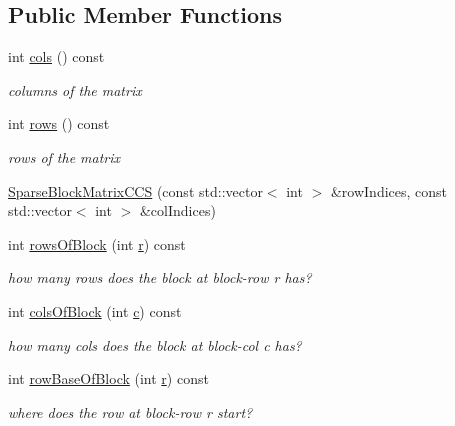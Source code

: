\subsection*{Public Member Functions}
\begin{DoxyCompactItemize}
\item 
int \hyperlink{classg2o_1_1SparseBlockMatrixCCS_a4f04707008af38a3c368eed74ad0bffc}{cols} () const 
\begin{DoxyCompactList}\small\item\em columns of the matrix \end{DoxyCompactList}\item 
int \hyperlink{classg2o_1_1SparseBlockMatrixCCS_ac40b53774ff036f56faaa0bfb87837c0}{rows} () const 
\begin{DoxyCompactList}\small\item\em rows of the matrix \end{DoxyCompactList}\item 
\hyperlink{classg2o_1_1SparseBlockMatrixCCS_abaeeb7ad0ba28f37dba85601882806f1}{Sparse\+Block\+Matrix\+C\+CS} (const std\+::vector$<$ int $>$ \&row\+Indices, const std\+::vector$<$ int $>$ \&col\+Indices)
\item 
int \hyperlink{classg2o_1_1SparseBlockMatrixCCS_a5152d431cdd268586dcde5cf79a5f202}{rows\+Of\+Block} (int \hyperlink{sparse__helper_8cpp_acab531abaa74a7e664e3986f2522b33a}{r}) const 
\begin{DoxyCompactList}\small\item\em how many rows does the block at block-\/row r has? \end{DoxyCompactList}\item 
int \hyperlink{classg2o_1_1SparseBlockMatrixCCS_a268101f9f1e179fdac973f9c565c168d}{cols\+Of\+Block} (int \hyperlink{sparse__helper_8cpp_a4e1e0e72dd773439e333c84dd762a9c3}{c}) const 
\begin{DoxyCompactList}\small\item\em how many cols does the block at block-\/col c has? \end{DoxyCompactList}\item 
int \hyperlink{classg2o_1_1SparseBlockMatrixCCS_a8b35a98d3343554699811f682042a647}{row\+Base\+Of\+Block} (int \hyperlink{sparse__helper_8cpp_acab531abaa74a7e664e3986f2522b33a}{r}) const 
\begin{DoxyCompactList}\small\item\em where does the row at block-\/row r start? \end{DoxyCompactList}\item 

\end{DoxyCompactItemize}
